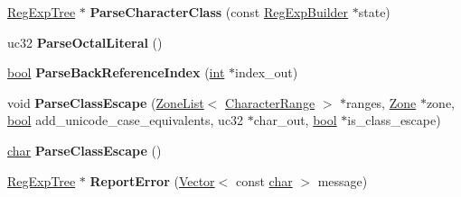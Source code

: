\begin{DoxyCompactItemize}
\item 
\mbox{\label{classv8_1_1internal_1_1RegExpParser_ab20888f703375f300fa31c29c7140e54}} 
\mbox{\hyperlink{classv8_1_1internal_1_1RegExpTree}{Reg\+Exp\+Tree}} $\ast$ {\bfseries Parse\+Character\+Class} (const \mbox{\hyperlink{classv8_1_1internal_1_1RegExpBuilder}{Reg\+Exp\+Builder}} $\ast$state)
\item 
\mbox{\label{classv8_1_1internal_1_1RegExpParser_a46257241d0debe60a302c8e6adef4451}} 
uc32 {\bfseries Parse\+Octal\+Literal} ()
\item 
\mbox{\label{classv8_1_1internal_1_1RegExpParser_acd679f7d4062d93ee52a6597755fbafe}} 
\mbox{\hyperlink{classbool}{bool}} {\bfseries Parse\+Back\+Reference\+Index} (\mbox{\hyperlink{classint}{int}} $\ast$index\+\_\+out)
\item 
\mbox{\label{classv8_1_1internal_1_1RegExpParser_aebf783fd710a2fc5939ba82e96c1748e}} 
void {\bfseries Parse\+Class\+Escape} (\mbox{\hyperlink{classv8_1_1internal_1_1ZoneList}{Zone\+List}}$<$ \mbox{\hyperlink{classv8_1_1internal_1_1CharacterRange}{Character\+Range}} $>$ $\ast$ranges, \mbox{\hyperlink{classv8_1_1internal_1_1Zone}{Zone}} $\ast$zone, \mbox{\hyperlink{classbool}{bool}} add\+\_\+unicode\+\_\+case\+\_\+equivalents, uc32 $\ast$char\+\_\+out, \mbox{\hyperlink{classbool}{bool}} $\ast$is\+\_\+class\+\_\+escape)
\item 
\mbox{\label{classv8_1_1internal_1_1RegExpParser_a1a2f0fd084013fcf31bf6808a428d321}} 
\mbox{\hyperlink{classchar}{char}} {\bfseries Parse\+Class\+Escape} ()
\item 
\mbox{\label{classv8_1_1internal_1_1RegExpParser_aed1a6dd79683375c986dc85c670483b8}} 
\mbox{\hyperlink{classv8_1_1internal_1_1RegExpTree}{Reg\+Exp\+Tree}} $\ast$ {\bfseries Report\+Error} (\mbox{\hyperlink{classv8_1_1internal_1_1Vector}{Vector}}$<$ const \mbox{\hyperlink{classchar}{char}} $>$ message)
\item 
\mbox{\label{classv8_1_1internal_1_1RegExpParser_a0a04fbdd7baf5ebea50dcdeee53848ba}} 

\end{DoxyCompactItemize}
